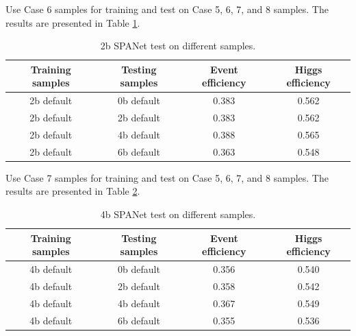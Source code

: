 \documentclass[12pt]{article}
\begin{document}
		Use Case 6 samples for training and test on Case 5, 6, 7, and 8 samples. The results are presented in Table \ref{tab:SPANet_1M_2b_default_test_on_different_triHiggs_data}.
		\begin{table}[htpb]
			\centering
			\caption{2b SPANet test on different samples.}
			\label{tab:SPANet_1M_2b_default_test_on_different_triHiggs_data}
			\begin{tabular}{cc|cc}
				Training samples & Testing samples & Event efficiency & Higgs efficiency \\
				\hline 
				2b default      & 0b default     & 0.383        & 0.562    \\
				2b default      & 2b default     & 0.383        & 0.562    \\
				2b default      & 4b default     & 0.388        & 0.565    \\
				2b default      & 6b default     & 0.363        & 0.548    \\
			\end{tabular}
		\end{table}	

		Use Case 7 samples for training and test on Case 5, 6, 7, and 8 samples. The results are presented in Table \ref{tab:SPANet_1M_4b_default_test_on_different_triHiggs_data}.
		\begin{table}[htpb]
			\centering
			\caption{4b SPANet test on different samples.}
			\label{tab:SPANet_1M_4b_default_test_on_different_triHiggs_data}
			\begin{tabular}{cc|cc}
				Training samples & Testing samples & Event efficiency & Higgs efficiency \\
				\hline 
				4b default      & 0b default     & 0.356        & 0.540    \\
				4b default      & 2b default     & 0.358        & 0.542    \\
				4b default      & 4b default     & 0.367        & 0.549    \\
				4b default      & 6b default     & 0.355        & 0.536    \\
			\end{tabular}
		\end{table}	
\end{document}
